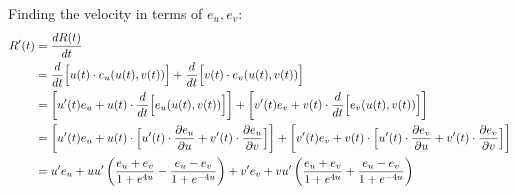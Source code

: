 \documentclass[a4paper, 11pt]{article}
\begin{document}
\begin{enumerate}[label=(\alph*)]
        Finding the velocity in terms of $e_u,e_v$:
        \begin{align*}
          R'(t) & = \dfrac{dR(t)}{dt}                                                                                                                                                                                    \\
                & = \dfrac{d}{dt}\Big[u(t)\cdot e_u(u(t),v(t))  \Big] + \dfrac{d}{dt}\Big[ v(t)\cdot e_v(u(t),v(t)) \Big]                                                                                                       \\
                & = \left[ u'(t)e_u  +u(t)\cdot\dfrac{d}{dt}\Big[e_u(u(t),v(t))\Big] \right] + \left[   v'(t)e_v +v(t)\cdot\dfrac{d}{dt}\Big[e_v(u(t),v(t))\Big]\right]                                                         \\
                & = \left[ u'(t)e_u  +u(t)\cdot\Big[u'(t)\cdot \dfrac{\partial e_u}{\partial u} + v'(t)\cdot \dfrac{\partial e_u}{\partial v}\Big] \right] + \left[   v'(t)e_v +v(t)\cdot\Big[u'(t)\cdot \dfrac{\partial e_v}{\partial u} + v'(t)\cdot \dfrac{\partial e_v}{\partial v}\Big]\right] \\
                & =  u'e_u  +uu'\left(
          \frac{e_u+e_v}{1+e^{4u}}
          -\frac{e_u-e_v}{1+e^{-4u}}
          \right)
          +    v'e_v +vu'\left(
          \frac{e_u+e_v}{1+e^{4u}}
          +\frac{e_u-e_v}{1+e^{-4u}}
          \right)
        \end{align*}


\end{enumerate}
\end{document}
